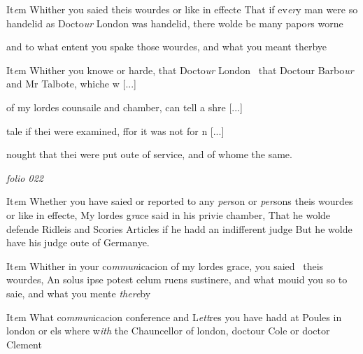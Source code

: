 \documentclass[12pt, a4paper]{book}
\begin{document}
		\ifthenelse{\isodd{\thepage}}
		{\reversemarginpar}
		{\normalmarginpar}
		 It\textit{e}m Whither you saied theis wourdes or like in effecte
That if ev\textit{er}y man were so handelid as Docto\textit{ur} London
 was handelid, there wolde be many papo\textit{r}s worne
			
 and to what entent you spake those wourdes, and what
 you meant therbye
            		
				\marginpar[\vspace{0.5cm}{\textcolor{Gray}{n}}]{}
			
		\ifthenelse{\isodd{\thepage}}
		{\reversemarginpar}
		{\normalmarginpar}
		It\textit{e}m Whither you knowe or harde, that Docto\textit{ur} London 
            			that Doctour Barbo\textit{ur} and Mr Talbote, whiche w
				[...]
			
            			of my lordes counsaile and chamber, can tell a shre
				[...]
			
            			tale if thei were examined, ffor it was not for n
				[...]
			
 nought
			 that thei were put oute of service, and of whome
 the same.
 

\dotfill
						\newpage
{}

\textit{folio 022}



		\ifthenelse{\isodd{\thepage}}
		{\reversemarginpar}
		{\normalmarginpar}
		It\textit{e}m Whether you have saied or reported to any \textit{per}son
	or \textit{per}sons theis wourdes or like in effecte, My lordes g\textit{ra}ce
 said in his privie chamber, That he wolde defende Ridleis
 and Scories Articles if he hadd an indifferent judge
 But he wolde have his judge oute of Germanye.

		\ifthenelse{\isodd{\thepage}}
		{\reversemarginpar}
		{\normalmarginpar}
		It\textit{e}m Whither in your co\textit{mmun}icacion of my lordes grace, you saied 
 theis wourdes, An solus ipse potest celum ruens sustinere,
 and what mouid you so to saie, and what you mente \textit{there}by
 	
				\marginpar[\vspace{0.5cm}{\textcolor{Gray}{n}}]{}
			
		\ifthenelse{\isodd{\thepage}}
		{\reversemarginpar}
		{\normalmarginpar}
		 It\textit{e}m What co\textit{mmun}icacion conference and L\textit{ett}res you have hadd at
 		Poules in london or els where w\textit{ith} the Chauncellor of london, doctour Cole or doctor Clement
			
\end{document}
